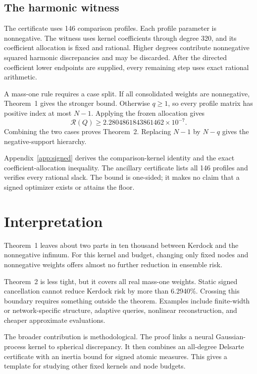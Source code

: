 \documentclass[11pt]{article}
\begin{document}
\subsection{The harmonic witness}\label{the-harmonic-witness}

The certificate uses 146 comparison profiles. Each profile parameter is
nonnegative. The witness uses kernel coefficients through degree 320, and
its coefficient allocation is fixed and rational. Higher degrees contribute
nonnegative squared harmonic discrepancies and may be discarded. After the
directed coefficient lower endpoints are supplied, every remaining step
uses exact rational arithmetic.

A mass-one rule requires a case split. If all consolidated weights are
nonnegative, Theorem~1 gives the stronger bound. Otherwise \(q\geq1\), so
every profile matrix has positive index at most \(N-1\). Applying the
frozen allocation gives
\[
\mathcal{R}(Q)
\geq 2.2804861843861462\times10^{-7}.
\]
Combining the two cases proves Theorem~2. Replacing \(N-1\) by \(N-q\)
gives the negative-support hierarchy.

Appendix~\ref{app:signed} derives the comparison-kernel identity and the
exact coefficient-allocation inequality. The ancillary certificate lists
all 146 profiles and verifies every rational slack. The bound is one-sided;
it makes no claim that a signed optimizer exists or attains the floor.

\section{Interpretation}\label{interpretation}

Theorem~1 leaves about two parts in ten thousand between Kerdock and the
nonnegative infimum. For this kernel and budget, changing only fixed nodes
and nonnegative weights offers almost no further reduction in ensemble
risk.

Theorem~2 is less tight, but it covers all real mass-one weights. Static
signed cancellation cannot reduce Kerdock risk by more than 6.2940\%.
Crossing this boundary requires something outside the theorem. Examples
include finite-width or network-specific structure, adaptive queries,
nonlinear reconstruction, and cheaper approximate evaluations.

The broader contribution is methodological. The proof links a neural
Gaussian-process kernel to spherical discrepancy. It then combines an
all-degree Delsarte certificate with an inertia bound for signed atomic
measures. This gives a template for studying other fixed kernels and node
budgets.
\end{document}
